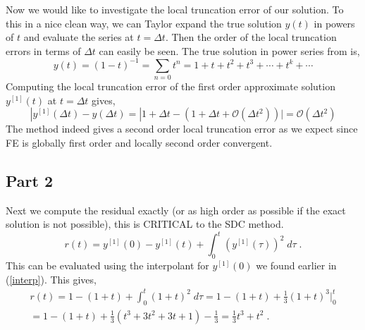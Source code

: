 \documentclass[11pt,oneside,a4paper]{article}
\begin{document}
Now we would like to investigate the local truncation error of our solution. To this in a nice clean way, we can Taylor expand the true solution $y(t)$ in powers of $t$ and evaluate the series at $t=\Delta t$. Then the order of the local truncation errors in terms of $\Delta t$ can easily be seen. The true solution in power series from is,
\begin{equation}
y(t)=(1-t)^{-1}=\sum_{n=0} t^n=1+t+t^2+t^3+\cdots+t^k+\cdots
\end{equation}
Computing the local truncation error of the first order approximate solution $y^{[1]}(t)$ at $t=\Delta t$ gives, 
\begin{equation}
|y^{[1]}(\Delta t)-y(\Delta t)=|1 + \Delta t - (1 +\Delta t +\mathcal{O}(\Delta t^2))|=\mathcal{O}(\Delta t^2)
\end{equation}
The method indeed gives a second order local truncation error as we expect since FE is globally first order and locally second order convergent. 
\subsection{Part 2}
Next we compute the residual exactly (or as high order as possible if the exact solution is not possible), this is CRITICAL to the SDC method.
\begin{equation}
r(t)=y^{[1]}(0)-y^{[1]}(t)+\int_0^t(y^{[1]}(\tau))^2\;d\tau\;.
\end{equation}
This can be evaluated using the interpolant for $y^{[1]}(0)$ we found earlier in (\ref{interp}). This gives,
\begin{align}
r(t)=1-(1+t)+\int_0^t(1+t)^2\;d\tau=1-(1+t)+\frac{1}{3}(1+t)^3|^{t}_{0}\nonumber\\
=1-(1+t)+\frac{1}{3}(t^3+3t^2+3t+1)-\frac{1}{3}=\frac{1}{3}t^3+t^2\;.
\end{align}
\end{document}
